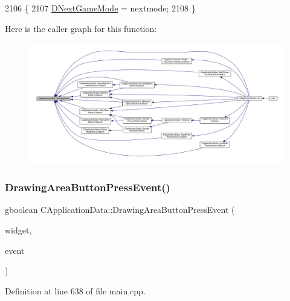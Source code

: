 \begin{DoxyCode}
2106                                                    \{
2107     \hyperlink{classCApplicationData_a3b67edeacd70201dcf96fa9fa8aa2107}{DNextGameMode} = nextmode;
2108 \}
\end{DoxyCode}
Here is the caller graph for this function\+:\nopagebreak
\begin{figure}[H]
\begin{center}
\leavevmode
\includegraphics[width=350pt]{classCApplicationData_aee18c113e9a0acb3cad3d63eb19de71b_icgraph}
\end{center}
\end{figure}
\hypertarget{classCApplicationData_ae7516e29f629998e4068ae1584d0237c}{}\label{classCApplicationData_ae7516e29f629998e4068ae1584d0237c} 
\subsubsection{\texorpdfstring{Drawing\+Area\+Button\+Press\+Event()}{DrawingAreaButtonPressEvent()}}
{\footnotesize\ttfamily gboolean C\+Application\+Data\+::\+Drawing\+Area\+Button\+Press\+Event (\begin{DoxyParamCaption}\item[{Gtk\+Widget $\ast$}]{widget,  }\item[{Gdk\+Event\+Button $\ast$}]{event }\end{DoxyParamCaption})\hspace{0.3cm}{\ttfamily [protected]}}



Definition at line 638 of file main.\+cpp.


